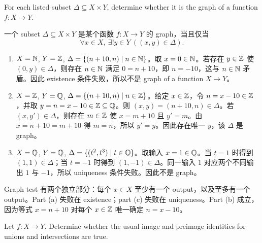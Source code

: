 \begin{exerciseblock}
For each listed subset \(\Delta\subseteq X\times Y\), determine whether it is the graph of a function \(f:X\to Y\).
\end{exerciseblock}

\begin{solution}
一个 subset \(\Delta\subseteq X\times Y\) 是某个函数 \(f:X\to Y\) 的 graph，当且仅当
\[
  \forall x\in X,\ \exists! y\in Y\ ((x,y)\in\Delta).
\]

\begin{enumerate}[label=(\alph*)]
  \item \(X=\mathbb{N}\), \(Y=\mathbb{Z}\), \(\Delta=\{(n+10,n)\mid n\in\mathbb{N}\}\)。取 \(x=0\in\mathbb{N}\)。若存在 \(y\in\mathbb{Z}\) 使 \((0,y)\in\Delta\)，则存在 \(n\in\mathbb{N}\) 满足 \(0=n+10\)，即 \(n=-10\)，这与 \(n\in\mathbb{N}\) 矛盾。因此 existence 条件失败，所以不是 graph of a function \(X\to Y\)。
  \item \(X=\mathbb{Z}\), \(Y=\mathbb{Q}\), \(\Delta=\{(n+10,n)\mid n\in\mathbb{Z}\}\)。给定 \(x\in\mathbb{Z}\)，令 \(n=x-10\in\mathbb{Z}\)，并取 \(y=n=x-10\in\mathbb{Z}\subseteq\mathbb{Q}\)。则 \((x,y)=(n+10,n)\in\Delta\)。若 \((x,y')\in\Delta\)，则存在 \(m\in\mathbb{Z}\) 使 \(x=m+10\) 且 \(y'=m\)。由 \(x=n+10=m+10\) 得 \(m=n\)，所以 \(y'=y\)。因此存在唯一 \(y\)，该 \(\Delta\) 是 graph。
  \item \(X=\mathbb{Q}\), \(Y=\mathbb{Q}\), \(\Delta=\{(t^2,t^3)\mid t\in\mathbb{Q}\}\)。取输入 \(x=1\in\mathbb{Q}\)。当 \(t=1\) 时得到 \((1,1)\in\Delta\)；当 \(t=-1\) 时得到 \((1,-1)\in\Delta\)。同一输入 \(1\) 对应两个不同输出 \(1\) 与 \(-1\)，所以 uniqueness 条件失败。因此不是 graph。
\end{enumerate}
\end{solution}

\begin{explanation}
Graph test 有两个独立部分：每个 \(x\in X\) 至少有一个 output，以及至多有一个 output。Part (a) 失败在 existence；part (c) 失败在 uniqueness。Part (b) 成立，因为等式 \(x=n+10\) 对每个 \(x\in\mathbb{Z}\) 唯一确定 \(n=x-10\)。
\end{explanation}

\begin{exerciseblock}
Let \(f:X\to Y\). Determine whether the usual image and preimage identities for unions and intersections are true.
\end{exerciseblock}

